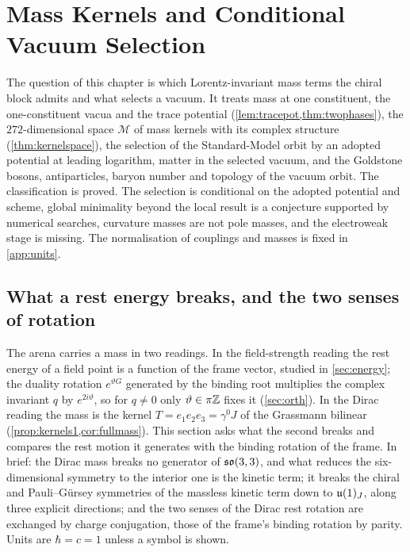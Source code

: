 \chapter{Mass Kernels and Conditional Vacuum Selection}
\label{ch:ch07_vacuum}

The question of this chapter is which Lorentz-invariant mass terms the chiral block admits and what selects a vacuum. It treats
mass at one constituent, the one-constituent vacua and the trace potential (\cref{lem:tracepot,thm:twophases}), the $272$-dimensional
space $\mathcal M$ of mass kernels with its complex structure (\cref{thm:kernelspace}), the selection of the Standard-Model orbit by an
adopted potential at leading logarithm, matter in the selected vacuum, and the Goldstone bosons, antiparticles, baryon number and
topology of the vacuum orbit. The classification is proved. The selection is conditional on the adopted potential and scheme, global
minimality beyond the local result is a conjecture supported by numerical searches, curvature masses are not pole masses, and the
electroweak stage is missing. The normalisation of couplings and masses is fixed in \cref{app:units}.



\section{What a rest energy breaks, and the two senses of rotation}
\label{sec:massbreaks}

The arena carries a mass in two readings. In the field-strength reading the rest energy of a field point is a function of the frame
vector, studied in \cref{sec:energy}; the duality rotation $e^{\vartheta G}$ generated by the binding root multiplies the complex
invariant $q$ by $e^{2i\vartheta}$, so for $q\neq0$ only $\vartheta\in\pi\mathbb{Z}$ fixes it (\cref{sec:orth}). In the Dirac reading the mass is
the kernel $T=e_1e_2e_3=\gamma^0J$ of the Grassmann bilinear (\cref{prop:kernels1,cor:fullmass}). This section asks what the second
breaks and compares the rest motion it generates with the binding rotation of the frame. In brief: the Dirac mass breaks no generator
of $\mathfrak{so}(3,3)$, and what reduces the six-dimensional symmetry to the interior one is the kinetic term; it breaks the chiral and
Pauli--G\"ursey symmetries of the massless kinetic term down to $\mathfrak{u}(1)_J$, along three explicit directions; and the two senses of the
Dirac rest rotation are exchanged by charge conjugation, those of the frame's binding rotation by parity. Units are $\hbar=c=1$ unless
a symbol is shown.

